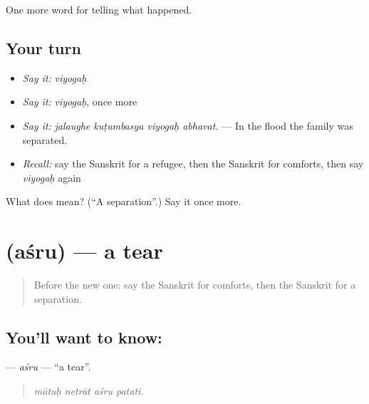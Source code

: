 \begin{grammarlens}[title={What you've built}]
One more word for telling what happened.
\end{grammarlens}

\subsection*{Your turn}
\begin{itemize}
\raggedright
  \item \emph{Say it:} \emph{viyogaḥ}
  \item \emph{Say it:} \emph{viyogaḥ}, once more
  \item \emph{Say it:} \emph{jalaughe kuṭumbasya viyogaḥ abhavat.} — In the flood the family was separated.
  \item \emph{Recall:} say the Sanskrit for a refugee, then the Sanskrit for comforts, then say \emph{viyogaḥ} again
\end{itemize}

\begin{tcolorbox}[breakable,colback=teal!4,colframe=teal!35!black,title={Before you move on}]
What does  mean? (\textquotedblleft{}A separation\textquotedblright{}.) Say it once more.
\end{tcolorbox}
\section[\texorpdfstring{\sk{अश्रु} (aśru)}{अश्रु (aśru)}]{ (aśru) — a tear}

\label{lesson:SA-C307-asru}



\begin{quote}
Before the new one: say the Sanskrit for comforts, then the Sanskrit for a separation.
\end{quote}

\subsection*{You'll want to know: }
\textbf{} — \emph{aśru} — \textquotedblleft{}a tear\textquotedblright{}.

\begin{quote}
   
\end{quote}

\begin{quote}
\emph{mātuḥ netrāt aśru patati.}
\end{quote}

